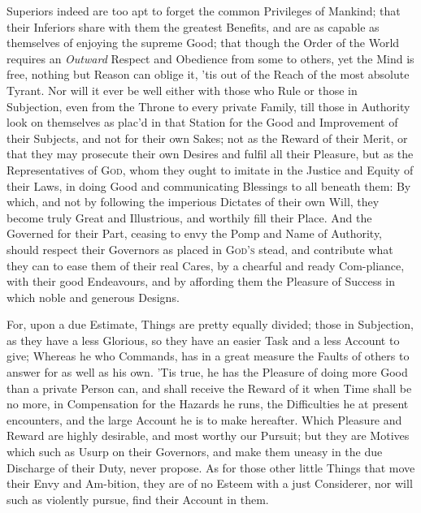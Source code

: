 Superiors indeed are too apt to forget the common Privileges of
Mankind; that their Inferiors share with them the greatest Benefits,
and are as capable as themselves of enjoying the supreme Good; that
though the Order of the World requires an \textit{Outward} Respect and
Obedience from some to others, yet the Mind  is free, nothing
but Reason can oblige it, 'tis out of the Reach of the most absolute
Tyrant. Nor will it ever be well either with those who Rule or those
in Subjection, even from the Throne to every private Family, till
those in Authority look on themselves as plac'd in that Station for
the Good and Improvement of their Subjects, and not for their own
Sakes; not as the Reward of their Merit, or that they may prosecute
their own Desires and fulfil all their Pleasure, but as the
Representatives of \textsc{God}, whom they ought to imitate in the
Justice and Equity of their Laws, in doing Good and communicating
Blessings to all beneath them: By which, and not by following the
imperious Dictates of their own Will, they become truly Great and
Illustrious, and worthily fill their Place. And the Governed for their
Part, ceasing to envy the Pomp and Name of Authority, should respect
their Governors as placed in \textsc{God's} stead, and contribute what
they can to ease them of their real Cares, by a chearful and ready
Com-pliance, with their good Endeavours, and by affording
them the Pleasure of Success in which noble and generous Designs.

For, upon a due Estimate, Things are pretty equally divided; those in
Subjection, as they have a less Glorious, so they have an easier Task
and a less Account to give; Whereas he who Commands, has in a great
measure the Faults of others to answer for as well as his own. 'Tis
true, he has the Pleasure of doing more Good than a private Person
can, and shall receive the Reward of it when Time shall be no more, in
Compensation for the Hazards he runs, the Difficulties he at present
encounters, and the large Account he is to make hereafter. Which
Pleasure and Reward are highly desirable, and most worthy our Pursuit;
but they are Motives which such as Usurp on their Governors, and make
them uneasy in the due Discharge of their Duty, never propose. As for
those other little Things that move their Envy and Am-bition,
they are of no Esteem with a just Considerer, nor will such as
violently pursue, find their Account in them.

